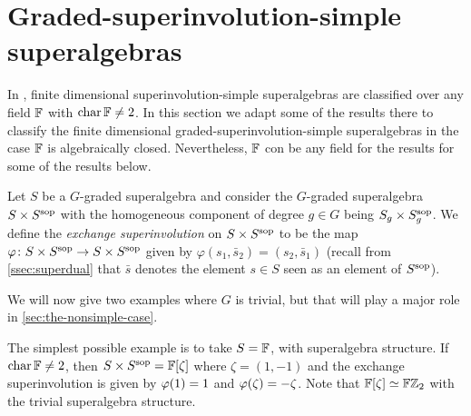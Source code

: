 \section{Graded-superinvolution-simple superalgebras}

In \cite{racine}, finite dimensional superinvolution-simple superalgebras are classified over any field $\mathbb{F}$ with $\operatorname{char} \mathbb{F} \neq 2$. 
In this section we adapt some of the results there to classify the finite dimensional graded-superinvolution-simple superalgebras in the case $\mathbb{F}$ is algebraically closed. 
Nevertheless, $\mathbb{F}$ con be any field for the results for some of the results below. 


\begin{defi}\label{def:SxSsop}
	Let $S$ be a $G$-graded superalgebra and consider the $G$-graded superalgebra $S \times S^{\mathrm{sop}}$ with the homogeneous component of degree $g\in G$ being $S_g \times S^{\mathrm{sop}}_g$. 
	We define the \emph{exchange superinvolution} on $S \times S^{\mathrm{sop}}$ to be the map $\varphi\colon S \times S^{\mathrm{sop}} \to S \times S^{\mathrm{sop}}$ given by $\varphi (s_1, \bar s_2) = (s_2, \bar s_1)$ (recall from \cref{ssec:superdual} that $\bar s$ denotes the element $s \in S$ seen as an element of $S^{\mathrm{sop}}$). 
\end{defi}

We will now give two examples where $G$ is trivial, but that will play a major role in \cref{sec:the-nonsimple-case}.

\begin{ex}\label{ex:FxF-iso-FZ2}
	The simplest possible example is to take $S = \mathbb{F}$, with superalgebra structure. 
	If $\operatorname{char} \mathbb{F} \neq 2$, then $S\times S^{\mathrm{sop}} = \mathbb{F} [\zeta]$ where $\zeta = (1, -1)$ and the exchange superinvolution is given by $\varphi(1) = 1$ and $\varphi(\zeta) = -\zeta$.
	Note that $\mathbb{F} [\zeta] \simeq \mathbb{F}\mathbb{Z}_2$ with the trivial superalgebra structure. 
\end{ex}

